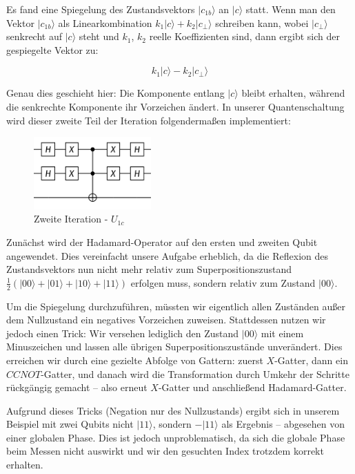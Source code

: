 Es fand eine Spiegelung des Zustandsvektors $|c_{1b}\rangle$ an $|c\rangle$ statt. Wenn man den Vektor $|c_{1b}\rangle$ als Linearkombination $k_1 |c\rangle + k_2 |c_{\perp}\rangle$ schreiben kann, wobei $|c_{\perp}\rangle$ senkrecht auf $|c\rangle$ steht und $k_1$, $k_2$ reelle Koeffizienten sind, dann ergibt sich der gespiegelte Vektor zu:

$$
k_1 |c\rangle - k_2 |c_{\perp}\rangle
$$

Genau dies geschieht hier: Die Komponente entlang $|c\rangle$ bleibt erhalten, während die senkrechte Komponente ihr Vorzeichen ändert. In unserer Quantenschaltung wird dieser zweite Teil der Iteration folgendermaßen implementiert:

\begin{figure}[h!]
    \centering
    \includegraphics[width=0.4\textwidth]{images/basic-algorithms/grover-2-iteration.png}
    \caption{Zweite Iteration - $U_{1c}$}
    \label{fig:grover-second-iteration}
\end{figure}

Zunächst wird der Hadamard-Operator auf den ersten und zweiten Qubit angewendet. Dies vereinfacht unsere Aufgabe erheblich, da die Reflexion des Zustandsvektors nun nicht mehr relativ zum Superpositionszustand $\frac{1}{2}(|00\rangle + |01\rangle + |10\rangle + |11\rangle)$ erfolgen muss, sondern relativ zum Zustand $|00\rangle$.

Um die Spiegelung durchzuführen, müssten wir eigentlich allen Zuständen außer dem Nullzustand ein negatives Vorzeichen zuweisen. Stattdessen nutzen wir jedoch einen Trick: Wir versehen lediglich den Zustand $|00\rangle$ mit einem Minuszeichen und lassen alle übrigen Superpositionszustände unverändert. Dies erreichen wir durch eine gezielte Abfolge von Gattern: zuerst $X$-Gatter, dann ein $CCNOT$-Gatter, und danach wird die Transformation durch Umkehr der Schritte rückgängig gemacht – also erneut $X$-Gatter und anschließend Hadamard-Gatter.

Aufgrund dieses Tricks (Negation nur des Nullzustands) ergibt sich in unserem Beispiel mit zwei Qubits nicht $|11\rangle$, sondern $-|11\rangle$ als Ergebnis – abgesehen von einer globalen Phase. Dies ist jedoch unproblematisch, da sich die globale Phase beim Messen nicht auswirkt und wir den gesuchten Index trotzdem korrekt erhalten.

